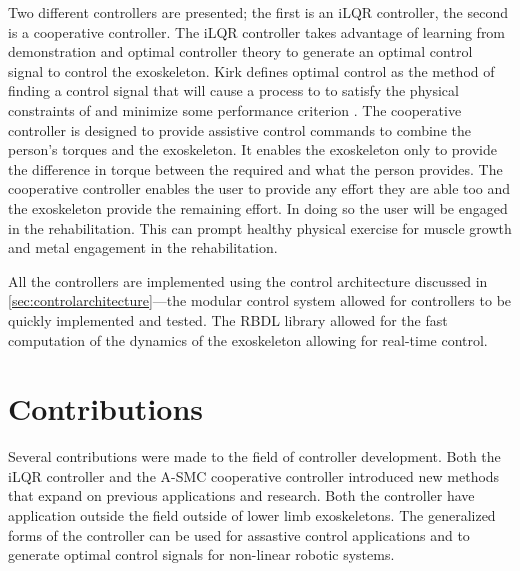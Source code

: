 Two different controllers are presented; the first is an iLQR controller, the second is a cooperative controller. The iLQR controller takes advantage of learning from demonstration and optimal controller theory to generate an optimal control signal to control the exoskeleton. Kirk defines optimal control as the method of finding a control signal that will cause a process to to satisfy the physical constraints of and minimize some performance criterion \cite{kirk2004optimal}.  The cooperative controller is designed to provide assistive control commands to combine the person's torques and the exoskeleton. It enables the exoskeleton only to provide the difference in torque between the required and what the person provides. The cooperative controller enables the user to provide any effort they are able too and the exoskeleton provide the remaining effort. In doing so the user will be engaged in the rehabilitation. This can prompt healthy physical exercise for muscle growth and metal engagement in the rehabilitation.   

All the controllers are implemented using the control architecture discussed in \autoref{sec:controlarchitecture}—the modular control system allowed for controllers to be quickly implemented and tested. The RBDL library allowed for the fast computation of the dynamics of the exoskeleton allowing for real-time control. 







\section{Contributions}

Several contributions were made to the field of controller development. Both the iLQR controller and the A-SMC cooperative controller introduced new methods that expand on previous applications and research. Both the controller have application outside the field outside of lower limb exoskeletons. The generalized forms of the controller can be used for assastive control applications and to generate optimal control signals for non-linear robotic systems. 


